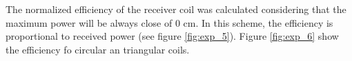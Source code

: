 \documentclass[a4paper,10pt]{article}
\begin{document}
The normalized efficiency of the receiver coil was calculated considering that the maximum power will be always close of 0 cm. In this scheme, the efficiency is proportional to received power (see figure \ref{fig:exp_5}). Figure \ref{fig:exp_6} show the efficiency fo circular an triangular coils.

\begin{figure}[tbp]
\begin{center}
\end{center}
\end{figure}
\end{document}
